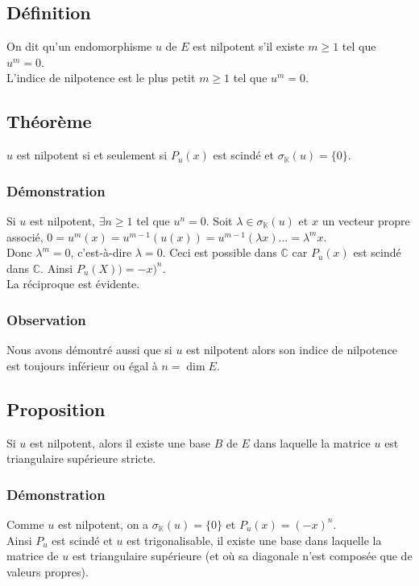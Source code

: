 \documentclass[a4paper,10pt]{book} %
\newcommand{\C}{\mathbb{C}}
\newcommand{\K}{\mathbb{K}}
\begin{document}
\subsection{Définition}
On dit qu'un endomorphisme $u$ de $E$ est nilpotent s'il existe $m\geq 1$ tel que $u^m=0$.\\

L'indice de nilpotence est le plus petit $m\geq 1$ tel que $u^m=0$.

\subsection{Théorème}
$u$ est nilpotent si et seulement si $P_u(x)$ est scindé et $\sigma_\K(u)=\{0\}$.

\subsubsection{Démonstration}
Si $u$ est nilpotent, $\exists n\geq 1$ tel que $u^n=0$.
Soit $\lambda\in \sigma_\K(u)$ et $x$ un vecteur propre associé, $0=u^m(x)=u^{m-1}(u(x))=u^{m-1}(\lambda x)...=\lambda^mx$.\\

Donc $\lambda^m=0$, c'est-à-dire $\lambda=0$. Ceci est possible dans $\C$ car $P_u(x)$ est scindé dans $\C$.
Ainsi $P_u(X))=-x)^n$.\\

La réciproque est évidente.

\subsubsection{Observation}
Nous avons démontré aussi que si $u$ est nilpotent alors son indice de nilpotence est toujours inférieur ou égal à $n=\dim E$.

\subsection{Proposition}
Si $u$ est nilpotent, alors il existe une base $B$ de $E$ dans laquelle la matrice $u$ est triangulaire supérieure stricte.

\subsubsection{Démonstration}
Comme $u$ est nilpotent, on a $\sigma_\K(u)=\{0\}$ et $P_u(x)=(-x)^n$.\\

Ainsi $P_u$ est scindé et $u$ est trigonalisable, il existe une base dans laquelle la matrice de $u$ est triangulaire supérieure (et où sa diagonale n'est composée que de valeurs propres).
\end{document}
